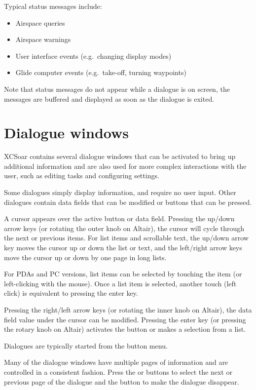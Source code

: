 Typical status messages include:
\begin{itemize}
\item Airspace queries
\item Airspace warnings
\item User interface events (e.g.\ changing display modes)
\item Glide computer events (e.g.\ take-off, turning waypoints)
\end{itemize}

Note that status messages do not appear while a dialogue is on screen, the
messages are buffered and displayed as soon as the dialogue is exited.


\section{Dialogue windows}\label{sec:dialog-windows}

XCSoar contains several dialogue windows that can be activated to bring up
additional information and are also used for more complex interactions with the
user, such as editing tasks and configuring settings.

Some dialogues simply display information, and require no user input. Other
dialogues contain data fields that can be modified or buttons that can be pressed.  

A cursor appears over the active button or data field. Pressing the up/down
arrow keys (or rotating the outer knob on Altair), the cursor will cycle
through the next or previous items. For list items and scrollable text, the
up/down arrow key moves the cursor up or down the list or text, and the
left/right arrow keys move the cursor up or down by one page in long lists.

For PDAs and PC versions, list items can be selected by touching the item (or
left-clicking with the mouse). Once a list item is selected, another touch
(left click) is equivalent to pressing the enter key.

Pressing the right/left arrow keys (or rotating the inner knob on Altair), the
data field value under the cursor can be modified. Pressing the enter key (or
pressing the rotary knob on Altair) activates the button or makes a selection
from a list.

Dialogues are typically started from the button menu.  

Many of the dialogue windows have multiple pages of information and are controlled
in a consistent fashion. Press the \bmenuw{$<$} or \bmenuw{$>$} buttons to
select the next or previous page of the dialogue and the  button 
to make the dialogue disappear.

